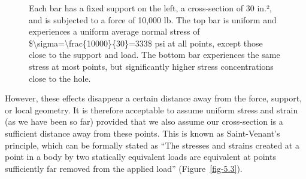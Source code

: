 \documentclass[
  letterpaper,
  DIV=11,
  numbers=noendperiod]{scrreprt}
\theoremstyle{definition}
\theoremstyle{remark}
\begin{document}
\begin{figure}


\caption{\label{fig-5.2}Each bar has a fixed support on the left, a
cross-section of 30 in.², and is subjected to a force of 10,000 lb. The
top bar is uniform and experiences a uniform average normal stress of
\$\textbackslash sigma=\textbackslash frac\{10000\}\{30\}=333\$ psi at
all points, except those close to the support and load. The bottom bar
experiences the same stress at most points, but significantly higher
stress concentrations close to the hole.}

\end{figure}%

However, these effects disappear a certain distance away from the force,
support, or local geometry. It is therefore acceptable to assume uniform
stress and strain (as we have been so far) provided that we also assume
our cross-section is a sufficient distance away from these points. This
is known as Saint-Venant's principle, which can be formally stated as
``The stresses and strains created at a point in a body by two
statically equivalent loads are equivalent at points sufficiently far
removed from the applied load'' (Figure~\ref{fig-5.3}).
\end{document}
